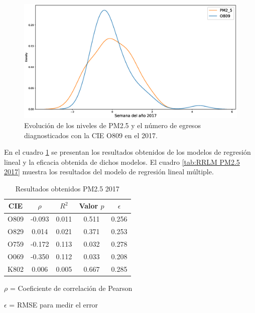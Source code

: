 \begin{figure}[h!]
\setcounter{figure}{2} %
\captionsetup{type=figure} %
\begin{center}
   \includegraphics[width=1\textwidth]{PM2_5_O809_2017.eps}
   \end{center}
    \caption[Series de tiempo 2017 PM2.5 Y O809]{Evolución de los niveles de PM2.5 y el número de egresos diagnosticados con la CIE O809 en el 2017.}
    \label{serie_de_tiempo_2017_PM25}
\end{figure}

En el cuadro \ref{tab:Resultados obtenidos PM2.5 2017} se presentan los resultados obtenidos de los modelos de regresión lineal y la eficacia obtenida de dichos modelos. El cuadro \ref{tab:RRLM PM2.5 2017} muestra los resultados del modelo de regresión lineal múltiple.

\begin{table}[hbt!]
\centering
\caption{Resultados obtenidos PM2.5 2017}
\label{tab:Resultados obtenidos PM2.5 2017}
\vspace{0.5cm}
\begin{threeparttable}
\begin{tabular}{|c|c|c|c|c|}
	\hline
	CIE & $\rho$ & $R^2$ & Valor $p$ & $\epsilon$\\
	\hline
	O809 & -0.093 & 0.011 & 0.511 & 0.256 \\
	\hline
	O829 & 0.014 & 0.021 & 0.371 & 0.253 \\
	\hline
	O759 & -0.172 & 0.113 & 0.032 & 0.278 \\
	\hline
	O069 & -0.350 & 0.112 & 0.033 & 0.208 \\
	\hline
	K802 & 0.006 & 0.005 & 0.667 & 0.285 \\
	\hline
\end{tabular}
\begin{tablenotes}
\footnotesize
\item{$\rho$ = Coeficiente de correlación de Pearson}
\item{$\epsilon$ = RMSE para medir el error}
\end{tablenotes}
\end{threeparttable}
\end{table}

